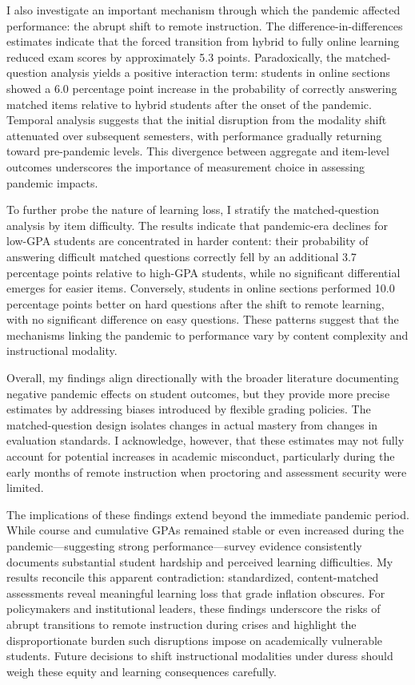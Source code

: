 \documentclass[
  12pt,
  letterpaper,
  DIV=11,
  numbers=noendperiod]{scrartcl}
\begin{document}
I also investigate an important mechanism through which the pandemic
affected performance: the abrupt shift to remote instruction. The
difference-in-differences estimates indicate that the forced transition
from hybrid to fully online learning reduced exam scores by
approximately 5.3 points. Paradoxically, the matched-question analysis
yields a positive interaction term: students in online sections showed a
6.0 percentage point increase in the probability of correctly answering
matched items relative to hybrid students after the onset of the
pandemic. Temporal analysis suggests that the initial disruption from
the modality shift attenuated over subsequent semesters, with
performance gradually returning toward pre-pandemic levels. This
divergence between aggregate and item-level outcomes underscores the
importance of measurement choice in assessing pandemic impacts.

To further probe the nature of learning loss, I stratify the
matched-question analysis by item difficulty. The results indicate that
pandemic-era declines for low-GPA students are concentrated in harder
content: their probability of answering difficult matched questions
correctly fell by an additional 3.7 percentage points relative to
high-GPA students, while no significant differential emerges for easier
items. Conversely, students in online sections performed 10.0 percentage
points better on hard questions after the shift to remote learning, with
no significant difference on easy questions. These patterns suggest that
the mechanisms linking the pandemic to performance vary by content
complexity and instructional modality.

Overall, my findings align directionally with the broader literature
documenting negative pandemic effects on student outcomes, but they
provide more precise estimates by addressing biases introduced by
flexible grading policies. The matched-question design isolates changes
in actual mastery from changes in evaluation standards. I acknowledge,
however, that these estimates may not fully account for potential
increases in academic misconduct, particularly during the early months
of remote instruction when proctoring and assessment security were
limited.

The implications of these findings extend beyond the immediate pandemic
period. While course and cumulative GPAs remained stable or even
increased during the pandemic---suggesting strong performance---survey
evidence consistently documents substantial student hardship and
perceived learning difficulties. My results reconcile this apparent
contradiction: standardized, content-matched assessments reveal
meaningful learning loss that grade inflation obscures. For policymakers
and institutional leaders, these findings underscore the risks of abrupt
transitions to remote instruction during crises and highlight the
disproportionate burden such disruptions impose on academically
vulnerable students. Future decisions to shift instructional modalities
under duress should weigh these equity and learning consequences
carefully.
\end{document}
